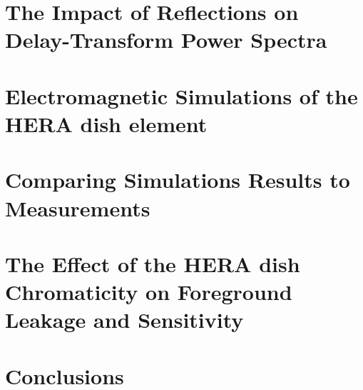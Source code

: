 \documentclass[twocolumn]{emulateapj}
\begin{document}
\section{The Impact of Reflections on Delay-Transform Power Spectra}\label{sec:Formalism}
\section{Electromagnetic Simulations of the HERA dish element}\label{sec:Simulations}
\section{Comparing Simulations Results to Measurements}
\label{sec:Comparison}
\section{The Effect of the HERA dish Chromaticity on Foreground Leakage and Sensitivity}
\label{sec:Foregrounds}
\section{Conclusions}
\label{sec:Conclusion}


\end{document}

